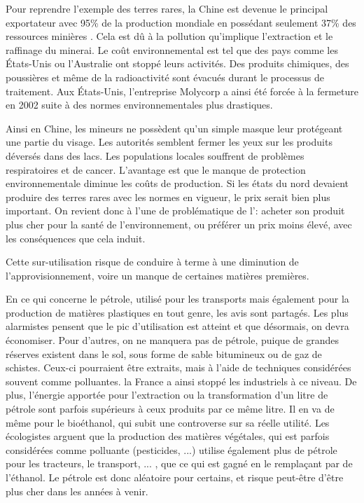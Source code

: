 Pour reprendre l'exemple des terres rares, la Chine est devenue le principal exportateur avec 95\% de la production mondiale en possédant seulement 37\% des ressources minières \cite{MongolieChine}. Cela est dû à la pollution qu'implique l'extraction et le raffinage du minerai. Le coût environnemental est tel que des pays comme les États-Unis ou l'Australie ont stoppé leurs activités. Des produits chimiques, des poussières et même de la radioactivité sont évacués durant le processus de traitement. Aux États-Unis, l'entreprise Molycorp a ainsi été forcée à la fermeture en 2002 suite à des normes environnementales plus drastiques.

Ainsi en Chine, les mineurs ne possèdent qu'un simple masque leur protégeant une partie du visage. Les autorités semblent fermer les yeux sur les produits déversés dans des lacs. Les populations locales souffrent de problèmes respiratoires et de cancer. L'avantage est que le manque de protection environnementale diminue les coûts de production. Si les états du nord devaient produire des terres rares avec les normes en vigueur, le prix serait bien plus important. On revient donc à l'une de problématique de l'\op : acheter son produit plus cher pour la santé de l'environnement, ou préférer un prix moins élevé, avec les conséquences que cela induit.


\medbreak Cette sur-utilisation risque de conduire à terme à une diminution de l'approvisionnement, voire un manque de certaines matières premières.

En ce qui concerne le pétrole, utilisé pour les transports mais également pour la production de matières plastiques en tout genre, les avis sont partagés. Les plus alarmistes pensent que le pic d'utilisation est atteint et que désormais, on devra économiser. Pour d'autres, on ne manquera pas de pétrole, puique de grandes réserves existent dans le sol, sous forme de sable bitumineux ou de gaz de schistes. Ceux-ci pourraient être extraits, mais à l'aide de techniques considérées souvent comme polluantes. la France a ainsi stoppé les industriels à ce niveau. De plus, l'énergie apportée pour l'extraction ou la transformation d'un litre de pétrole sont parfois supérieurs à ceux produits par ce même litre. Il en va de même pour le bioéthanol, qui subit une controverse sur sa réelle utilité. Les écologistes arguent que la production des matières végétales, qui est parfois considérées comme polluante (pesticides, ...) utilise également plus de pétrole pour les tracteurs, le transport, ... , que ce qui est gagné en le remplaçant par de l’éthanol. Le pétrole est donc aléatoire pour certains, et risque peut-être d'être plus cher dans les années à venir.


